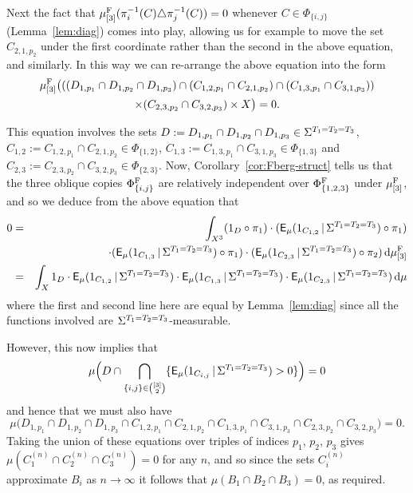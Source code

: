 \documentclass[12pt]{article}
\begin{document}
Next the fact that
$\mu^{\rm{F}}_{[3]}(\pi_i^{-1}(C)\triangle\pi_j^{-1}(C)) = 0$
whenever $C \in \Phi_{\{i,j\}}$ (Lemma~\ref{lem:diag}) comes into
play, allowing us for example to move the set $C_{2,1,p_2}$ under
the first coordinate rather than the second in the above equation,
and similarly. In this way we can re-arrange the above equation into
the form
\begin{multline*}
\mu^{\rm{F}}_{[3]}\big(((D_{1,p_1}\cap D_{1,p_2}\cap D_{1,p_3})\cap
(C_{1,2,p_1}\cap C_{2,1,p_2})\cap (C_{1,3,p_1}\cap C_{3,1,p_3}))\\
\times (C_{2,3,p_2}\cap C_{3,2,p_3})\times X\big) = 0.
\end{multline*}

This equation involves the sets $D := D_{1,p_1}\cap D_{1,p_2}\cap
D_{1,p_3} \in \S^{T_1 = T_2 = T_3}$, $C_{1,2} := C_{1,2,p_1}\cap
C_{2,1,p_2} \in \Phi_{\{1,2\}}$, $C_{1,3} := C_{1,3,p_1}\cap
C_{3,1,p_3} \in \Phi_{\{1,3\}}$ and $C_{2,3} := C_{2,3,p_2}\cap
C_{3,2,p_3} \in \Phi_{\{2,3\}}$.  Now,
Corollary~\ref{cor:Fberg-struct} tells us that the three oblique
copies $\Phi_{\{i,j\}}^{\rm{F}}$ are relatively independent over
$\Phi_{\{1,2,3\}}^{\rm{F}}$ under $\mu^{\rm{F}}_{[3]}$, and so we
deduce from the above equation that
\begin{eqnarray*}
0&=&\int_{X^3}(1_D\circ\pi_1)\cdot(\sfE_\mu(1_{C_{1,2}}\,|\,\S^{T_1
=
T_2 = T_3})\circ\pi_1)\\
&&\quad\quad\quad\quad\quad\quad\cdot(\sfE_\mu(1_{C_{1,3}}\,|\,\S^{T_1
= T_2 = T_3})\circ\pi_1)\cdot (\sfE_\mu(1_{C_{2,3}}\,|\,\S^{T_1 =
T_2 =
T_3})\circ\pi_2)\,\d\mu^{\rm{F}}_{[3]}\\
&=& \int_X 1_D\cdot\sfE_\mu(1_{C_{1,2}}\,|\,\S^{T_1 = T_2 =
T_3})\cdot\sfE_\mu(1_{C_{1,3}}\,|\,\S^{T_1 = T_2 = T_3})\cdot
\sfE_\mu(1_{C_{2,3}}\,|\,\S^{T_1 = T_2 = T_3})\,\d\mu
\end{eqnarray*}
where the first and second line here are equal by
Lemma~\ref{lem:diag} since all the functions involved are $\S^{T_1 =
T_2 = T_3}$-measurable.

However, this now implies that
\[\mu\Big(D\cap \bigcap_{\{i,j\}\in\binom{[3]}{2}}\{\sfE_\mu(1_{C_{i,j}}\,|\,\S^{T_1 = T_2 =
T_3}) > 0\}\Big) = 0\] and hence that we must also have
\[\mu\big(D_{1,p_1}\cap D_{1,p_2}\cap
D_{1,p_3}\cap C_{1,2,p_1}\cap C_{2,1,p_2}\cap C_{1,3,p_1}\cap
C_{3,1,p_3}\cap C_{2,3,p_2}\cap C_{3,2,p_3}\big) = 0.\] Taking the
union of these equations over triples of indices $p_1$, $p_2$, $p_3$
gives $\mu(C_1^{(n)}\cap C_2^{(n)}\cap C_3^{(n)}) = 0$ for any $n$,
and so since the sets $C_i^{(n)}$ approximate $B_i$ as $n\to\infty$
it follows that $\mu(B_1\cap B_2\cap B_3) = 0$, as required. \fin
\end{document}
